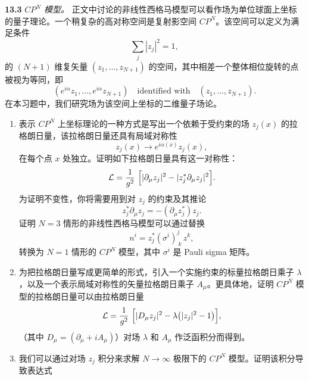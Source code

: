 \textbf{13.3} \emph{$CP^N$ 模型。} 正文中讨论的非线性西格马模型可以看作场为单位球面上坐标的量子理论。一个稍复杂的高对称空间是复射影空间 $CP^N$。该空间可以定义为满足条件
\begin{equation}
  \sum_j |z_j|^2 = 1 ,
\end{equation}
的 $(N+1)$ 维复矢量 $(z_1, \ldots, z_{N+1})$ 的空间，其中相差一个整体相位旋转的点被视为等同，即
\begin{equation}
  (e^{i\alpha}z_1, \ldots, e^{i\alpha}z_{N+1}) \quad
  \text{identified with} \quad (z_1, \ldots, z_{N+1}) .
\end{equation}
在本习题中，我们研究场为该空间上坐标的二维量子场论。
\begin{enumerate}[label=(\alph*)]
  \item 表示 $CP^N$ 上坐标理论的一种方式是写出一个依赖于受约束的场 $z_j(x)$ 的拉格朗日量，该拉格朗日量还具有局域对称性
    \begin{equation}
      z_j(x) \to e^{i\alpha(x)} z_j(x) ,
    \end{equation}
    在每个点 $x$ 处独立。证明如下拉格朗日量具有这一对称性：
    \begin{equation}
      \mathcal{L} = \frac{1}{g^2}\ \Bigl[ |\partial_\mu z_j|^2
        - |z_j^{*}\partial_\mu z_j|^2 \Bigr] .
    \end{equation}
    为证明不变性，你将需要用到对 $z_j$ 的约束及其推论
    \begin{equation}
      z_j^{*}\partial_\mu z_j = -(\partial_\mu z_j^{*})z_j .
    \end{equation}
    证明 $N = 3$ 情形的非线性西格马模型可以通过替换
    \begin{equation}
      n^i = z^{*}_j(\sigma^i)^j_{\ k}\,z^k ,
    \end{equation}
    转换为 $N = 1$ 情形的 $CP^N$ 模型，其中 $\sigma^i$ 是 Pauli sigma 矩阵。
  \item 为把拉格朗日量写成更简单的形式，引入一个实施约束的标量拉格朗日乘子 $\lambda$，以及一个表示局域对称性的矢量拉格朗日乘子 $A_\mu$。更具体地，证明 $CP^N$ 模型的拉格朗日量可以由拉格朗日量
    \begin{equation}
      \mathcal{L} = \frac{1}{g^2}\ \Bigl[ |D_\mu z_j|^2 - \lambda\bigl(
        |z_j|^2 - 1 \bigr) \Bigr] ,
    \end{equation}
    （其中 $D_\mu = (\partial_\mu + iA_\mu)$）对场 $\lambda$ 和 $A_\mu$ 作泛函积分而得到。
  \item 我们可以通过对场 $z_j$ 积分来求解 $N\to\infty$ 极限下的 $CP^N$ 模型。证明该积分导致表达式
    \begin{equation}

\end{equation}
\end{enumerate}
